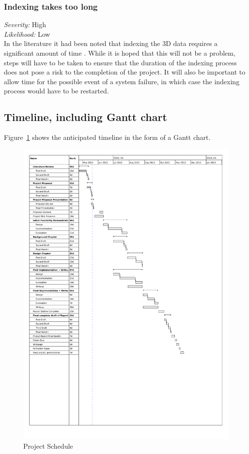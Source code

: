\documentclass[12pt,a4paper]{article}
\begin{document}
\subsubsection*{Indexing takes too long}
\noindent \textit{Severity: } High \\
\noindent \textit{Likelihood: } Low \\
In the literature it had been noted that indexing the 3D data requires a significant
amount of time \cite{interactivepointclouds}. While it is hoped that this will not be
a problem, steps will have to be taken to ensure that the duration of the indexing
process does not pose a risk to the completion of the project. It will also be important
to allow time for the possible event of a system failure, in which case the indexing
process would have to be restarted.
\subsection{Timeline, including Gantt chart}
Figure~\ref{gant} shows the anticipated timeline in the form of a Gantt chart.
\begin{figure}[h!]
\centering
    \includegraphics[width=1\textwidth]{gantt1.pdf}
    \caption{Project Schedule}
    \label{gant}
\end{figure}
\end{document}
